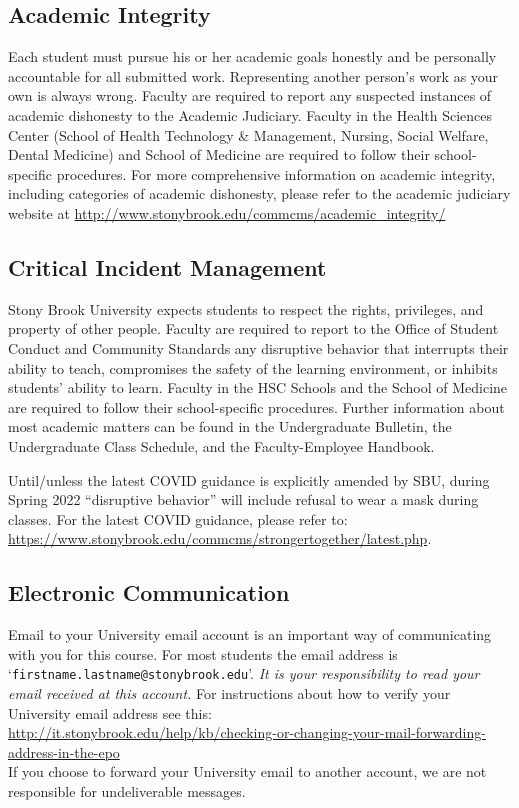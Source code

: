 \documentclass[10pt]{article}
\begin{document}
\subsection*{Academic Integrity}

Each student must pursue his or her academic goals honestly
and be personally accountable for all submitted work. Representing
another person's work as your own is always wrong. Faculty are
required to report any suspected instances of academic dishonesty to
the Academic Judiciary. Faculty in the Health Sciences Center (School
of Health Technology \& Management, Nursing, Social Welfare, Dental
Medicine) and School of Medicine are required to follow their
school-specific procedures. For more comprehensive information on
academic integrity, including categories of academic dishonesty,
please refer to the academic judiciary website at
\url{http://www.stonybrook.edu/commcms/academic\_integrity/}

\subsection*{Critical Incident Management}

Stony Brook University expects students to respect the rights,
privileges, and property of other people. Faculty are required to
report to the Office of Student Conduct and Community Standards any
disruptive behavior that interrupts their ability to teach,
compromises the safety of the learning environment, or inhibits
students' ability to learn. Faculty in the HSC Schools and the School
of Medicine are required to follow their school-specific
procedures. Further information about most academic matters can be
found in the Undergraduate Bulletin, the Undergraduate Class Schedule,
and the Faculty-Employee Handbook.

Until/unless the latest COVID guidance is explicitly amended by SBU,
during Spring 2022 ``disruptive behavior'' will include refusal to wear
a mask during classes.  For the latest COVID guidance, please refer to:
\url{https://www.stonybrook.edu/commcms/strongertogether/latest.php}.


\subsection*{Electronic Communication}

Email to your University email account is an important way
of communicating with you for this course.  For most students the
email address is `{\tt firstname.lastname@stonybrook.edu}'.
{\em It is your responsibility to read your email received at this
  account.}  For instructions about how to verify your University
email address see this: \\
{\footnotesize \url{http://it.stonybrook.edu/help/kb/checking-or-changing-your-mail-forwarding-address-in-the-epo}}\\
If you choose to forward your University email to another account, we
are not responsible for undeliverable messages.
\end{document}
